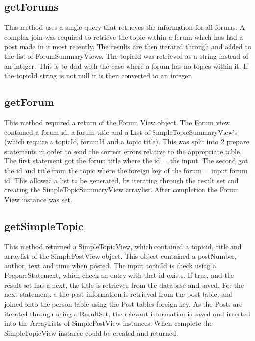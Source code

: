 \documentclass{article}
\begin{document}
\subsection*{getForums}

This method uses a single query that retrieves the information for all forums. A complex join was required to retrieve the topic within a forum which has had a post made in it most recently. The results are then iterated through and added to the list of ForumSummaryViews. The topicId was retrieved as a string instead of an integer. This is to deal with the case where a forum has no topics within it. If the topicId string is not null it is then converted to an integer.

\subsection*{getForum}

This method required a return of the Forum View object. The Forum view contained a forum id, a forum title and a List of SimpleTopicSummaryView's (which require a topicId, forumId and a topic title). This was split into 2 prepare statements in order to send the correct errors relative to the appropriate table. The first statement got the forum title where the id = the input. The second got the id and title from the topic where the foreign key of the forum = input forum id. This allowed a list to be generated, by iterating through the result set and creating the SimpleTopicSummaryView arraylist. After completion the Forum View instance was set.


\subsection*{getSimpleTopic}

This method returned a SimpleTopicView, which contained a topicid, title and arraylist of the SimplePostView object. This object contained a postNumber, author, text and time when posted. The input topicId is check using a PrepareStatement, which check an entry with that id exists. If true, and the result set has a next, the title is retrieved from the database and saved. For the next statement, a the post information is retrieved from the post table, and joined onto the person table using the Post tables foreign key. As the Posts are iterated through using a ResultSet, the relevant information is saved and inserted into the ArrayLists of SimplePostView instances. When complete the SimpleTopicView instance could be created and returned.
\end{document}
